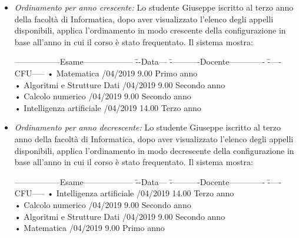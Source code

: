 \begin{itemize}
	\item \textit{Ordinamento per anno crescente:}
	Lo studente Giuseppe iscritto al terzo anno della facoltà di Informatica, dopo aver visualizzato l'elenco degli appelli disponibili, applica l'ordinamento in modo crescente della configurazione in base all’anno in cui il corso è stato frequentato. Il sistema mostra:
	\begin{tabbing}
		\hspace{1cm}-----------------Esame------------------ \= --Data--- \= -----------Docente------------- \= -----CFU----- \kill
		\hspace{1cm} • Matematica /04/2019 9.00 \> \hspace{2cm} Primo anno \\
		\hspace{1cm} • Algoritmi e Strutture Dati /04/2019 9.00\> \hspace{2cm} Secondo anno \\
		\hspace{1cm} • Calcolo numerico /04/2019 9.00 \> \hspace{2cm} Secondo anno \\
		\hspace{1cm} • Intelligenza artificiale /04/2019 14.00\> \hspace{2cm} Terzo anno  \\
	\end{tabbing}
	
	\item \textit{Ordinamento per anno decrescente:}
	Lo studente Giuseppe iscritto al terzo anno della facoltà di Informatica, dopo aver visualizzato l'elenco degli appelli disponibili, applica l'ordinamento in modo decrescente della configurazione in base all’anno in cui il corso è stato frequentato. Il sistema mostra:
	\begin{tabbing}
		\hspace{1cm}-----------------Esame------------------ \= --Data--- \= -----------Docente------------- \= -----CFU----- \kill
		\hspace{1cm} • Intelligenza artificiale /04/2019 14.00\> \hspace{2cm} Terzo anno  \\
		\hspace{1cm} • Calcolo numerico /04/2019 9.00 \> \hspace{2cm} Secondo anno \\
		\hspace{1cm} • Algoritmi e Strutture Dati /04/2019 9.00\> \hspace{2cm} Secondo anno \\
		\hspace{1cm} • Matematica /04/2019 9.00 \> \hspace{2cm} Primo anno \\
	\end{tabbing}
	

\end{itemize}
